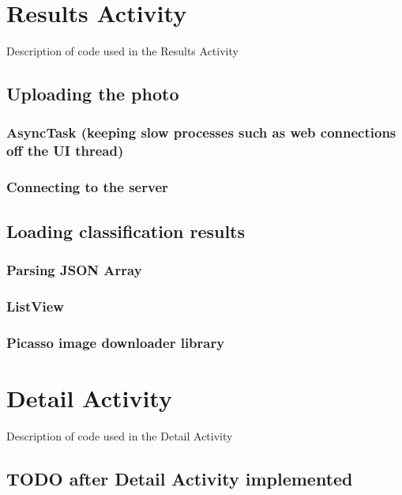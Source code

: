 \documentclass[11pt, a4paper]{report}
\begin{document}
\section{Results Activity}

Description of code used in the Results Activity

\subsection{Uploading the photo}

\subsubsection{AsyncTask (keeping slow processes such as web connections off the UI thread)}

\subsubsection{Connecting to the server}

\subsection{Loading classification results}

\subsubsection{Parsing JSON Array}

\subsubsection{ListView}

\subsubsection{Picasso image downloader library}

\section{Detail Activity}

Description of code used in the Detail Activity

\subsection{TODO after Detail Activity implemented}
\end{document}
